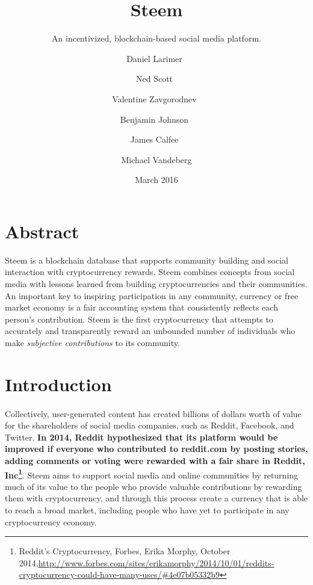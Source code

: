 \documentclass{article}
\title{Steem}
\subtitle{An incentivized, blockchain-based social media platform.}
\date{March 2016}
\author{
	Daniel Larimer\
	\and
	Ned Scott\
	\and
	Valentine Zavgorodnev\
	\and
	Benjamin Johnson\
	\and
	James Calfee\
	\and
	Michael Vandeberg
	}
\begin{document}
	\renewcommand \thesection{\roman{section}}

	\maketitle

	\newpage

	\section{Abstract}

		Steem is a blockchain database that supports community building and social interaction with cryptocurrency rewards. Steem combines concepts from social media with lessons learned from building cryptocurrencies and their communities. An important key to inspiring participation in any community, currency or free market economy is a fair accounting system that consistently reflects each person's contribution. Steem is the first cryptocurrency that attempts to accurately and transparently reward an unbounded number of individuals who make \textit{subjective contributions} to its community.

	\newpage

	\tableofcontents

	\newpage

	\setcounter{section}{0}

	\renewcommand \thesection{\arabic{section}}

	\section{Introduction}

	    \paragraph{}
			Collectively, user-generated content has created billions of dollars worth of value for the shareholders of social media companies, such as Reddit, Facebook, and Twitter. \textbf{In 2014, Reddit hypothesized that its platform would be improved if everyone who contributed to reddit.com by posting stories, adding comments or voting were rewarded with a fair share in Reddit, Inc\footnote{Reddit's Cryptocurrency, Forbes, Erika Morphy, October 2014,\newline\url{http://www.forbes.com/sites/erikamorphy/2014/10/01/reddits-cryptocurrency-could-have-many-uses/\#4e07b05332b9}}}. Steem aims to support social media and online communities by returning much of its value to the people who provide valuable contributions by rewarding them with cryptocurrency, and through this process create a currency that is able to reach a broad market, including people who have yet to participate in any cryptocurrency economy.
\end{document}
